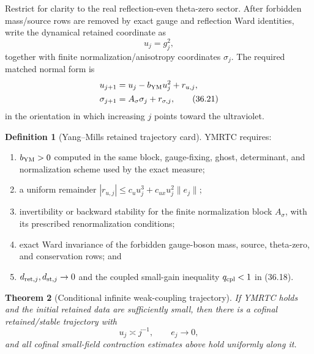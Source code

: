\documentclass[11pt,oneside]{book}
\newtheorem{theorem}{Theorem}[chapter]
\theoremstyle{definition}
\newtheorem{definition}[theorem]{Definition}
\theoremstyle{remark}
\begin{document}
Restrict for clarity to the real reflection-even theta-zero sector.
After forbidden mass/source rows are removed by exact gauge and
reflection Ward identities, write the dynamical retained coordinate
as
\[
                         u_j=g_j^2,                              \tag{36.20}
\]
together with finite normalization/anisotropy coordinates
\(\sigma_j\).  The required matched normal form is
\[
\begin{split}
 u_{j+1}&=u_j-b_{\rm YM}u_j^2+r_{u,j},\\
 \sigma_{j+1}&=A_\sigma\sigma_j+r_{\sigma,j},                    \tag{36.21}
\end{split}
\]
in the orientation in which increasing \(j\) points toward the
ultraviolet.

\begin{definition}[Yang--Mills retained trajectory card]
\label{def:e8v36-retained-card}
YMRTC requires:
\begin{enumerate}
\item \(b_{\rm YM}>0\) computed in the same block, gauge-fixing,
      ghost, determinant, and normalization scheme used by the
      exact measure;
\item a uniform remainder
      \(|r_{u,j}|\leq c_uu_j^3+
      c_{ux}u_j^2\|e_j\|\);
\item invertibility or backward stability for the finite
      normalization block \(A_\sigma\), with its prescribed
      renormalization conditions;
\item exact Ward invariance of the forbidden gauge-boson mass,
      source, theta-zero, and conservation rows; and
\item \(d_{{\rm ret},j},d_{{\rm st},j}\to0\) and the coupled
      small-gain inequality \(q_{\rm cpl}<1\) in (36.18).
\end{enumerate}
\end{definition}

\begin{theorem}[Conditional infinite weak-coupling trajectory]
\label{thm:e8v36-conditional-trajectory}
If YMRTC holds and the initial retained data are sufficiently small,
then there is a cofinal retained/stable trajectory with
\[
 u_j\asymp j^{-1},\qquad e_j\to0,                                \tag{36.22}
\]
and all cofinal small-field contraction estimates above hold
uniformly along it.
\end{theorem}
\end{document}
